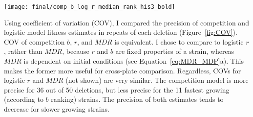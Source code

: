 \graphicspath{{images/COV/}}
\begin{Figure}
  \centering
  \texttt{[image: final/comp\_b\_log\_r\_median\_rank\_his3\_bold]}
  \label{fig:COV}
\end{Figure}
\begin{multicols}{2}


Using coefficient of variation (COV), I compared the precision of
competition and logistic model fitness estimates in repeats of each
deletion (Figure~\ref{fig:COV}). COV of competition \(b\), \(r\), and
\(MDR\) is equivalent. I chose to compare to logistic \(r\), rather
than \(MDR\), because \(r\) and \(b\) are fixed properties of a
strain, whereas \(MDR\) is dependent on initial conditions (see
Equation~\ref{eq:MDR_MDP}a). This makes the former more useful for
cross-plate comparison. Regardless, COVs for logistic \(r\) and
\(MDR\) (not shown) are very similar.
The competition model is more precise for 36 out of 50 deletions, but
less precise for the 11 fastest growing (according to \(b\) ranking)
strains. The precision of both estimates tends to decrease for slower
growing strains.




\end{multicols}
